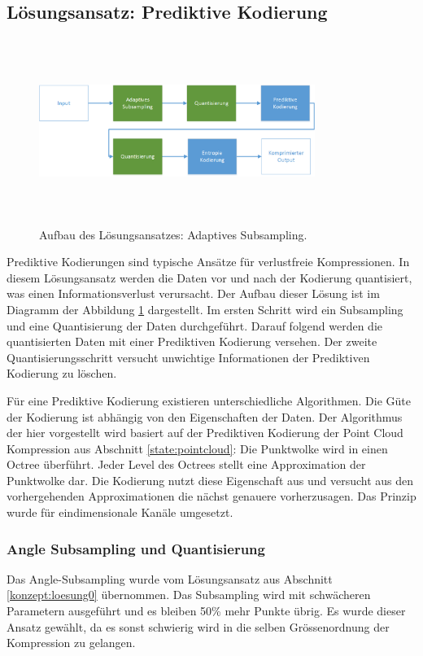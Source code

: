 \subsection{Lösungsansatz: Prediktive Kodierung} \label{konzept:prediktiv}
\begin{figure}[!htbp]
	\center
	\includegraphics[width=0.8\textwidth,height=6cm,keepaspectratio]{./pictures/konzept/solution2/aufbau.png}
	\caption{Aufbau des Lösungsansatzes: Adaptives Subsampling.}
	\label{konzept:loesung2:aufbau}
\end{figure}
Prediktive Kodierungen sind typische Ansätze für verlustfreie Kompressionen. In diesem Lösungsansatz werden die Daten vor und nach der Kodierung quantisiert, was einen Informationsverlust verursacht. Der Aufbau dieser Lösung ist im Diagramm der Abbildung \ref{konzept:loesung2:aufbau} dargestellt. Im ersten Schritt wird ein Subsampling und eine Quantisierung der Daten durchgeführt. Darauf folgend werden die quantisierten Daten mit einer Prediktiven Kodierung versehen. Der zweite Quantisierungsschritt versucht unwichtige Informationen der Prediktiven Kodierung zu löschen. 

Für eine Prediktive Kodierung existieren unterschiedliche Algorithmen. Die Güte der Kodierung ist abhängig von den Eigenschaften der Daten. Der Algorithmus der hier vorgestellt wird basiert auf der Prediktiven Kodierung der Point Cloud Kompression aus Abschnitt \ref{state:pointcloud}: Die Punktwolke wird in einen Octree überführt. Jeder Level des Octrees stellt eine Approximation der Punktwolke dar. Die Kodierung nutzt diese Eigenschaft aus und versucht aus den vorhergehenden Approximationen die nächst genauere vorherzusagen. Das Prinzip wurde für eindimensionale Kanäle umgesetzt.

\subsubsection{Angle Subsampling und Quantisierung}
Das Angle-Subsampling wurde vom Lösungsansatz aus Abschnitt \ref{konzept:loesung0} übernommen. Das Subsampling wird mit schwächeren Parametern ausgeführt und es bleiben 50\% mehr Punkte übrig. Es wurde dieser Ansatz gewählt, da es sonst schwierig wird in die selben Grössenordnung der Kompression zu gelangen.

